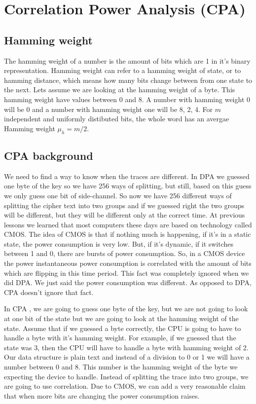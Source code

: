 \section{Correlation Power Analysis (CPA)}\label{c8_cpa:sec}

\subsection{Hamming weight}\label{c8_CPA_hamming_weight:subsec}

The hamming weight \cite{hamming} of a number is the amount of bits which are 1 in it's binary
representation. Hamming weight can refer to a hamming weight of state, or to
hamming distance, which means how many bits change between from one state to the
next. Lets assume we are looking at the hamming weight of a byte. This hamming
weight have values between 0 and 8. A number with hamming weight 0 will be 0 and
a number with hamming weight one will be 8, 2, 4. For $m$ independent and uniformly
distibuted bits, the whole word has an avergae Hamming weight $\mu_h = m/2$.

\subsection{CPA background}\label{c8_CPA_background:subsec}

We need to find a way to know when the traces are different. In DPA \cite{kocher1999differential, kocher1998introduction} we guessed
one byte of the key so we have 256 ways of splitting, but still, based on this
guess we only guess one bit of side-channel. So now we have 256 different ways
of splitting the cipher text into two groups and if we guessed right the two
groups will be different, but they will be different only at the correct time.
At previous lessons we learned that most computers these days are based on
technology called CMOS. The idea of CMOS is that if nothing much is happening,
if it's in a static state,  the power consumption is very low. But, if it's
dynamic, if it switches between 1 and 0, there are bursts of power consumption.
So, in a CMOS device the power instantaneous power consumption is correlated
with the amount of bits which are flipping in this time period. This fact was
completely ignored when we did DPA. We just said the power consumption was
different. As opposed to DPA, CPA doesn't ignore that fact. 

In CPA \cite{brier2004correlation, coron1962statistics, mayer2000smartly, oswald2003side},
we are going to guess one byte of the key, but we are not going to look
at one bit of the state but we are going to look at the hamming weight of the
state. Assume that if we guessed a byte correctly, the CPU is going to have to
handle a byte with it's hamming weight. For example, if we  guessed that the
state was 3, then the CPU will have to handle a byte with hamming weight of 2.
Our data structure is plain text and instead of a division to 0 or 1 we will
have a number between 0 and 8. This number is the hamming weight of the byte we
expecting the device to handle. Instead of splitting the trace into two groups,
we are going to use correlation. Due to CMOS, we can add a very reasonable claim
that when more bits are changing the power consumption raises.

